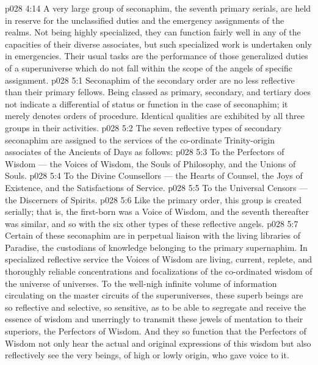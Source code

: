 \vs p028 4:14 \bibnobreakspace {} A very large group of seconaphim, the seventh primary serials, are held in reserve for the unclassified duties and the emergency assignments of the realms. Not being highly specialized, they can function fairly well in any of the capacities of their diverse associates, but such specialized work is undertaken only in emergencies. Their usual tasks are the performance of those generalized duties of a superuniverse which do not fall within the scope of the angels of specific assignment.
\vs p028 5:1 Seconaphim of the secondary order are no less reflective than their primary fellows. Being classed as primary, secondary, and tertiary does not indicate a differential of status or function in the case of seconaphim; it merely denotes orders of procedure. Identical qualities are exhibited by all three groups in their activities.
\vs p028 5:2 \pc The seven reflective types of secondary seconaphim are assigned to the services of the co\hyp{}ordinate Trinity\hyp{}origin associates of the Ancients of Days as follows:
\vs p028 5:3 To the Perfectors of Wisdom --- the Voices of Wisdom, the Souls of Philosophy, and the Unions of Souls.
\vs p028 5:4 To the Divine Counsellors --- the Hearts of Counsel, the Joys of Existence, and the Satisfactions of Service.
\vs p028 5:5 To the Universal Censors --- the Discerners of Spirits.
\vs p028 5:6 \pc Like the primary order, this group is created serially; that is, the first\hyp{}born was a Voice of Wisdom, and the seventh thereafter was similar, and so with the six other types of these reflective angels.
\vs p028 5:7 \bibnobreakspace {} Certain of these seconaphim are in perpetual liaison with the living libraries of Paradise, the custodians of knowledge belonging to the primary supernaphim. In specialized reflective service the Voices of Wisdom are living, current, replete, and thoroughly reliable concentrations and focalizations of the co\hyp{}ordinated wisdom of the universe of universes. To the well\hyp{}nigh infinite volume of information circulating on the master circuits of the superuniverses, these superb beings are so reflective and selective, so sensitive, as to be able to segregate and receive the essence of wisdom and unerringly to transmit these jewels of mentation to their superiors, the Perfectors of Wisdom. And they so function that the Perfectors of Wisdom not only hear the actual and original expressions of this wisdom but also reflectively see the very beings, of high or lowly origin, who gave voice to it.
